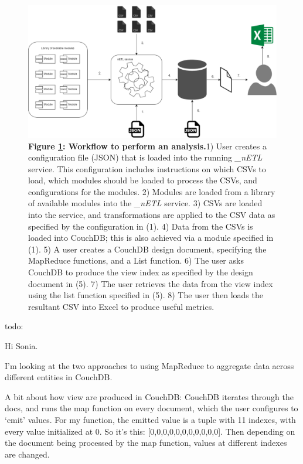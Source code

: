 \begin{figure}[ht]
    \centering
    \begin{mdframed}
        \centering
        \includegraphics[scale=0.35]{./resources/figures/analysis-workflow.png}
    \end{mdframed}
    \caption[Analysis Workflow]{\textbf{Figure \ref{analysis-workflow}: Workflow to perform an analysis.}1) User creates a configuration file (JSON) that is loaded into the running \textit{\_nETL} service. This configuration includes instructions on which CSVs to load, which modules should be loaded to process the CSVs, and configurations for the modules. 2) Modules are loaded from a library of available modules into the \textit{\_nETL} service. 3) CSVs are loaded into the service, and transformations are applied to the CSV data as specified by the configuration in (1). 4) Data from the CSVs is loaded into CouchDB; this is also achieved via a module specified in (1). 5) A user creates a CouchDB design document, specifying the MapReduce functions, and a List function. 6) The user asks CouchDB to produce the view index as specified by the design document in (5). 7) The user retrieves the data from the view index using the list function specified in (5). 8) The user then loads the resultant CSV into Excel to produce useful metrics.}
    \label{analysis-workflow}
\end{figure}





todo:

Hi Sonia.

I’m looking at the two approaches to using MapReduce to aggregate data across different entities in CouchDB.

A bit about how view are produced in CouchDB:
CouchDB iterates through the docs, and runs the map function on every document, which the user configures to ‘emit’ values. For my function, the emitted value is a tuple with 11 indexes, with every value initialized at 0. So it’s this: [0,0,0,0,0,0,0,0,0,0,0]. Then depending on the document being processed by the map function, values at different indexes are changed.

